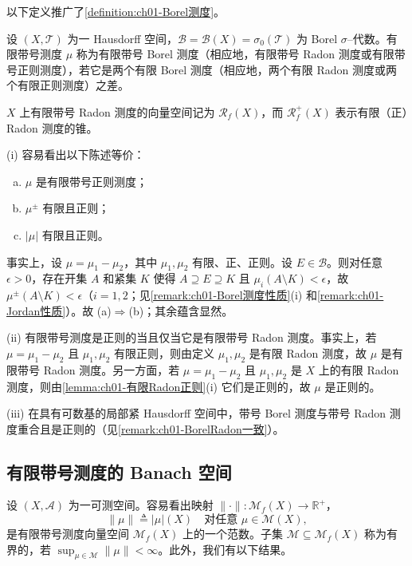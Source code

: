 \documentclass[../../main.tex]{subfiles}%
\begin{document}
以下定义推广了\cref{definition:ch01-Borel测度}。

\begin{definition}\label{definition:ch01-有限带号Borel}\label{definition:ch01-带号Radon测度}
设 $(X,\mathcal{T})$ 为一 Hausdorff 空间，$\mathcal{B}=\mathcal{B}(X)=\sigma_0(\mathcal{T})$ 为 Borel $\sigma$--代数。有限带号测度 $\mu$ 称为有限带号 Borel 测度（相应地，有限带号 Radon 测度或有限带号正则测度），若它是两个有限 Borel 测度（相应地，两个有限 Radon 测度或两个有限正则测度）之差。
\end{definition}

$X$ 上有限带号 Radon 测度的向量空间记为 $\mathscr{R}_f(X)$，而 $\mathscr{R}^+_f(X)$ 表示有限（正）Radon 测度的锥。

\begin{remark}\label{remark:ch01-有限带号正则}
(i) 容易看出以下陈述等价：
\begin{enumerate}[(a)]
\item $\mu$ 是有限带号正则测度；
\item $\mu^\pm$ 有限且正则；
\item $|\mu|$ 有限且正则。
\end{enumerate}
事实上，设 $\mu=\mu_1-\mu_2$，其中 $\mu_1,\mu_2$ 有限、正、正则。设 $E\in\mathcal{B}$。则对任意 $\epsilon>0$，存在开集 $A$ 和紧集 $K$ 使得 $A\supseteq E\supseteq K$ 且 $\mu_i(A\setminus K)<\epsilon$，故 $\mu^\pm(A\setminus K)<\epsilon$（$i=1,2$；见\cref{remark:ch01-Borel测度性质}(i) 和\cref{remark:ch01-Jordan性质}）。故 (a)$\Rightarrow$(b)；其余蕴含显然。

(ii) 有限带号测度是正则的当且仅当它是有限带号 Radon 测度。事实上，若 $\mu=\mu_1-\mu_2$ 且 $\mu_1,\mu_2$ 有限正则，则由定义 $\mu_1,\mu_2$ 是有限 Radon 测度，故 $\mu$ 是有限带号 Radon 测度。另一方面，若 $\mu=\mu_1-\mu_2$ 且 $\mu_1,\mu_2$ 是 $X$ 上的有限 Radon 测度，则由\cref{lemma:ch01-有限Radon正则}(i) 它们是正则的，故 $\mu$ 是正则的。

(iii) 在具有可数基的局部紧 Hausdorff 空间中，带号 Borel 测度与带号 Radon 测度重合且是正则的（见\cref{remark:ch01-BorelRadon一致}）。
\end{remark}

\subsection{有限带号测度的 Banach 空间}\label{subsection:ch01-Banach空间}

设 $(X,\mathcal{A})$ 为一可测空间。容易看出映射 $\|\cdot\|:\mathcal{M}_f(X)\to\mathbb{R}^+$，
\[
\|\mu\|\triangleq |\mu|(X)\quad\text{对任意 }\mu\in\mathcal{M}(X),
\]
是有限带号测度向量空间 $\mathcal{M}_f(X)$ 上的一个范数。子集 $\mathcal{M}\subseteq\mathcal{M}_f(X)$ 称为有界的，若 $\sup_{\mu\in\mathcal{M}}\|\mu\|<\infty$。此外，我们有以下结果。
\end{document}
